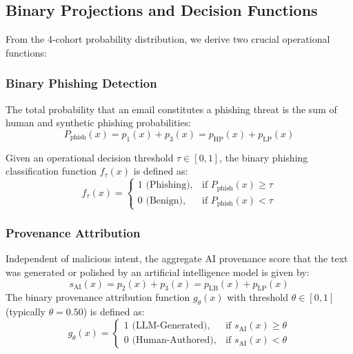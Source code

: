 \documentclass[journal]{IEEEtran}
\begin{document}
\subsection{Binary Projections and Decision Functions}
From the 4-cohort probability distribution, we derive two crucial operational functions:

\subsubsection{Binary Phishing Detection}
The total probability that an email constitutes a phishing threat is the sum of human and synthetic phishing probabilities:
\begin{equation}
    P_{\text{phish}}(x) = p_1(x) + p_3(x) = p_{\text{HP}}(x) + p_{\text{LP}}(x)
\end{equation}

Given an operational decision threshold $\tau \in [0, 1]$, the binary phishing classification function $f_{\tau}(x)$ is defined as:
\begin{equation}
    f_{\tau}(x) = \begin{cases}
        1 \text{ (Phishing)}, & \text{if } P_{\text{phish}}(x) \ge \tau \\
        0 \text{ (Benign)},   & \text{if } P_{\text{phish}}(x) < \tau
    \end{cases}
\end{equation}

\subsubsection{Provenance Attribution}
Independent of malicious intent, the aggregate AI provenance score that the text was generated or polished by an artificial intelligence model is given by:
\begin{equation}
    s_{\text{AI}}(x) = p_2(x) + p_3(x) = p_{\text{LB}}(x) + p_{\text{LP}}(x)
\end{equation}
The binary provenance attribution function $g_{\theta}(x)$ with threshold $\theta \in [0, 1]$ (typically $\theta = 0.50$) is defined as:
\begin{equation}
    g_{\theta}(x) = \begin{cases}
        1 \text{ (LLM-Generated)}, & \text{if } s_{\text{AI}}(x) \ge \theta \\
        0 \text{ (Human-Authored)}, & \text{if } s_{\text{AI}}(x) < \theta
    \end{cases}
\end{equation}
\end{document}
